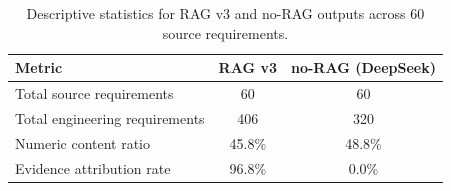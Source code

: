 \begin{table}[H]
\caption{Descriptive statistics for RAG v3 and no-RAG outputs across 60 source requirements.}
\label{tab:descriptive}
\begin{tabular}{lcc}
\toprule
\textbf{Metric} & \textbf{RAG v3} & \textbf{no-RAG (DeepSeek)} \\
\midrule
Total source requirements & 60 & 60 \\
Total engineering requirements & 406 & 320 \\
Numeric content ratio & 45.8\% & 48.8\% \\
Evidence attribution rate & 96.8\% & 0.0\% \\
\bottomrule
\end{tabular}
\end{table}
